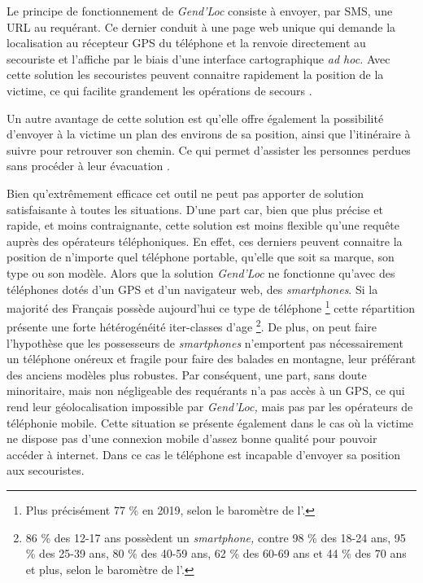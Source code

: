 Le principe de fonctionnement de \emph{Gend'Loc} consiste à envoyer,
par SMS, une URL au requérant. Ce dernier conduit à une page web
unique qui demande la localisation au récepteur GPS du téléphone et la
renvoie directement au secouriste et l'affiche par le biais d'une
interface cartographique \emph{ad hoc.}  Avec cette solution les
secouristes peuvent connaitre rapidement la position de la victime, ce
qui facilite grandement les opérations de secours
\autocite{Muscat2015}.

Un autre avantage de cette solution est qu'elle offre également la
possibilité d'envoyer à la victime un plan des environs de sa
position, ainsi que l'itinéraire à suivre pour retrouver son
chemin. Ce qui permet d'assister les personnes perdues sans procéder à
leur évacuation \autocite{Muscat2015}.

Bien qu’extrêmement efficace cet outil ne peut pas apporter de
solution satisfaisante à toutes les situations. D'une part car, bien
que plus précise et rapide, et moins contraignante, cette solution est
moins flexible qu'une requête auprès des opérateurs téléphoniques.
En effet, ces derniers peuvent connaitre la position de n'importe quel
téléphone portable, qu'elle que soit sa marque, son type ou son
modèle. Alors que la solution \emph{Gend'Loc} ne fonctionne qu'avec
des téléphones dotés d'un GPS et d'un navigateur web, des
\emph{smartphones}. Si la majorité des Français possède aujourd'hui
ce type de téléphone \footnote{Plus précisément 77 \% en 2019, selon
  le baromètre de l'\textcite{ARCEP2019}.} cette répartition présente
une forte hétérogénéité iter-classes d'age \footnote{86 \% des 12-17
  ans possèdent un \emph{smartphone,} contre 98 \% des 18-24 ans, 95
  \% des 25-39 ans, 80 \% des 40-59 ans, 62 \% des 60-69 ans et 44 \%
  des 70 ans et plus, selon le baromètre de
  l'\textcite{ARCEP2019}.}. De plus, on peut faire l'hypothèse que les
possesseurs de \emph{smartphones} n'emportent pas nécessairement un
téléphone onéreux et fragile pour faire des balades en montagne, leur
préférant des anciens modèles plus robustes. Par conséquent, une part,
sans doute minoritaire, mais non négligeable des requérants n'a pas
accès à un GPS, ce qui rend leur géolocalisation impossible par
\emph{Gend'Loc,} mais pas par les opérateurs de téléphonie mobile.
Cette situation se présente également dans le cas où la victime ne
dispose pas d'une connexion mobile d'assez bonne qualité pour pouvoir
accéder à internet. Dans ce cas le téléphone est incapable d'envoyer
sa position aux secouristes.

